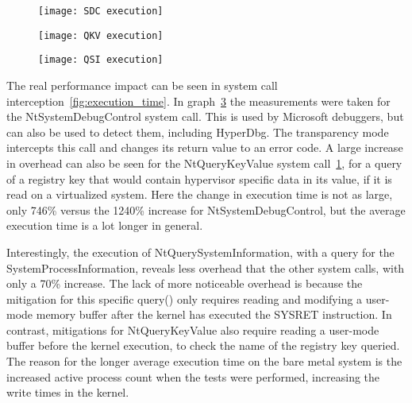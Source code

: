 \begin{figure*}[th]
    \begin{subfigure}[t]{\threecolgrid}
        \texttt{[image: SDC execution]}
        \sfigcap{}\label{fig:exec-time-a}
    \end{subfigure}
    \begin{subfigure}[t]{\threecolgrid}
        \texttt{[image: QKV execution]}
        \sfigcap{}\label{fig:exec-time-b}
    \end{subfigure}
    \begin{subfigure}[t]{\threecolgrid}
        \texttt{[image: QSI execution]}
        \sfigcap{}\label{fig:exec-time-c}
    \end{subfigure}
    \label{fig:execution_time}
\end{figure*}

The real performance impact can be seen in system call interception~\ref{fig:execution_time}. In graph~\ref{fig:exec-time-c} 
the measurements were taken for the NtSystemDebugControl system call. 
This is used by Microsoft debuggers, but can also be used to detect them, including HyperDbg. The transparency mode intercepts this call 
and changes its return value to an error code. A large increase in overhead can also be seen for the NtQueryKeyValue system call~\ref{fig:exec-time-a}, 
for a query of a registry key that would contain hypervisor specific data in its value, if it is read on a virtualized system.
Here the change in execution time is not as large, only 746\% versus the 1240\% increase for NtSystemDebugControl, but the average execution time is a lot longer in general.

Interestingly, the execution of NtQuerySystemInformation, with a query for the SystemProcessInformation, reveals less overhead that the other system calls, 
with only a 70\% increase. The lack of more noticeable overhead is because the mitigation for this specific query() 
only requires reading and modifying a user-mode memory buffer after the kernel has executed the SYSRET instruction. In contrast, mitigations for NtQueryKeyValue 
also require reading a user-mode buffer before the kernel execution, to check the name of the registry key queried. 
The reason for the longer average execution time on the bare metal system is the increased active process count when the tests were performed, increasing the write times in the kernel.


